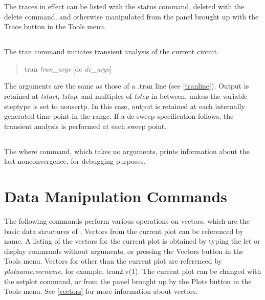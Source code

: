 The traces in effect can be listed with the {\cb status} command,
deleted with the {\cb delete} command, and otherwise manipulated from
the panel brought up with the {\cb Trace} button in the {\cb Tools}
menu.

\subsection{}


The {\cb tran} command initiates transient analysis of the current
circuit.
\begin{quote}\vt
tran {\it tran\_args} [dc {\it dc\_args\/}]
\end{quote}
The arguments are the same as those of a {\vt .tran} line (see
\ref{tranline}).  Output is retained at {\it tstart}, {\it tstop}, and
multiples of {\it tstep} in between, unless the variable {\et
steptype} is set to {\vt nousertp}.  In this case, output is retained
at each internally generated time point in the range.  If a dc sweep
specification follows, the transient analysis is performed at each
sweep point.

\subsection{}


The {\cb where} command, which takes no arguments, prints information
about the last nonconvergence, for debugging purposes.


\section{Data Manipulation Commands}


The following commands perform various operations on vectors, which
are the basic data structures of {\WRspice}.  Vectors from the current
plot can be referenced by name.  A listing of the vectors for the
current plot is obtained by typing the {\cb let} or {\cb display}
commands without arguments, or pressing the {\cb Vectors} button in
the {\cb Tools} menu.  Vectors for other than the current plot are
referenced by {\it plotname\/}.{\it vecname}, for example, {\vt
tran2.v(1)}.  The current plot can be changed with the {\cb setplot}
command, or from the panel brought up by the {\cb Plots} button in the
{\cb Tools} menu.  See \ref{vectors} for more information about
vectors.

